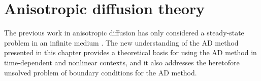 
\chapter{Anisotropic diffusion theory}\label{chap:adDerivation}

The previous work in anisotropic diffusion has only considered a steady-state
problem in an infinite medium \cite{Lar2009c,Mor2007}. The new understanding of
the AD method presented in this chapter provides a theoretical basis for
using the AD method in time-dependent and nonlinear contexts, and it also
addresses the heretofore unsolved problem of boundary conditions for the AD
method.


